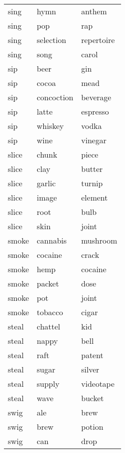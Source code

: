 \begin{longtable}{l|ll}
sing      & hymn           & anthem       \\
sing      & pop            & rap          \\
sing      & selection      & repertoire   \\
sing      & song           & carol        \\
sip       & beer           & gin          \\
sip       & cocoa          & mead         \\
sip       & concoction     & beverage     \\
sip       & latte          & espresso     \\
sip       & whiskey        & vodka        \\
sip       & wine           & vinegar      \\
slice     & chunk          & piece        \\
slice     & clay           & butter       \\
slice     & garlic         & turnip       \\
slice     & image          & element      \\
slice     & root           & bulb         \\
slice     & skin           & joint        \\
smoke     & cannabis       & mushroom     \\
smoke     & cocaine        & crack        \\
smoke     & hemp           & cocaine      \\
smoke     & packet         & dose         \\
smoke     & pot            & joint        \\
smoke     & tobacco        & cigar        \\
steal     & chattel        & kid          \\
steal     & nappy          & bell         \\
steal     & raft           & patent       \\
steal     & sugar          & silver       \\
steal     & supply         & videotape    \\
steal     & wave           & bucket       \\
swig      & ale            & brew         \\
swig      & brew           & potion       \\
swig      & can            & drop         \\

\end{longtable}
